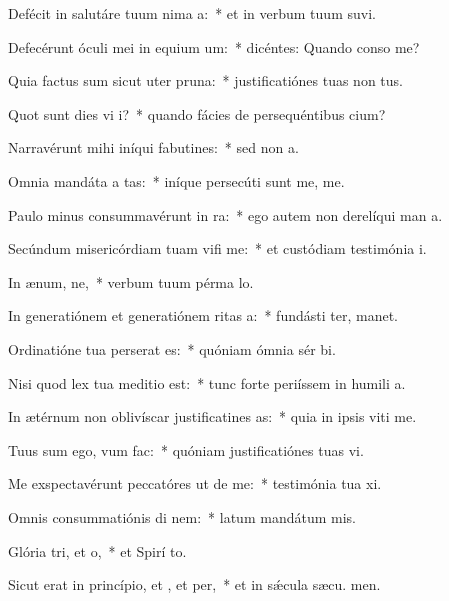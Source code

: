 \item Defécit in salutáre tuum nima a:~* et in verbum tuum suvi.
\item Defecérunt óculi mei in equium um:~* dicéntes: Quando conso me?
\item Quia factus sum sicut uter  pruna:~* justificatiónes tuas non  tus.
\item Quot sunt dies vi i?~* quando fácies de persequéntibus  cium?
\item Narravérunt mihi iníqui fabutines:~* sed non   a.
\item Omnia mandáta a tas:~* iníque persecúti sunt me,  me.
\item Paulo minus consummavérunt  in ra:~* ego autem non derelíqui man a.
\item Secúndum misericórdiam tuam vifi me:~* et custódiam testimónia  i.
\item In ænum, ne,~* verbum tuum pérma  lo.
\item In generatiónem et generatiónem ritas a:~* fundásti ter,  manet.
\item Ordinatióne tua perserat es:~* quóniam ómnia sér bi.
\item Nisi quod lex tua meditio  est:~* tunc forte periíssem in humili a.
\item In ætérnum non oblivíscar justificatines as:~* quia in ipsis viti me.
\item Tuus sum ego, vum  fac:~* quóniam justificatiónes tuas vi.
\item Me exspectavérunt peccatóres ut de me:~* testimónia tua xi.
\item Omnis consummatiónis di nem:~* latum mandátum  mis.
\item Glória tri, et o,~* et Spirí to.
\item Sicut erat in princípio, et , et per,~* et in sǽcula sæcu. men.
